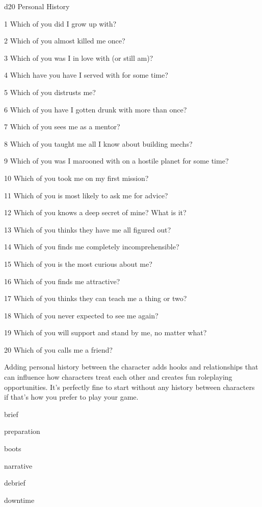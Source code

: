  d20       Personal	History

 1         Which of you did I grow up with?

 2         Which of you almost killed me once?

 3         Which of you was I in love with (or still am)?

 4         Which have you have I served with for some time?

 5         Which of you distrusts me?

 6         Which of you have I gotten drunk with more than once?

 7         Which of you sees me as a mentor?

 8         Which of you taught me all I know about building mechs?

 9         Which of you was I marooned with on a hostile planet for some time?

10       Which of you took me on my first mission?

  11       Which of you is most likely to ask me for advice?

  12       Which of you knows a deep secret of mine? What is it?

  13       Which of you thinks they have me all figured out?

  14       Which of you finds me completely incomprehensible?

  15       Which of you is the most curious about me?

  16       Which of you finds me attractive?

  17       Which of you thinks they can teach me a thing or two?

  18       Which of you never expected to see me again?

  19       Which of you will support and stand by me, no matter what?

  20       Which of you calls me a friend?

Adding personal history between the character adds hooks and relationships that can influence
how characters treat each other and creates fun roleplaying opportunities. It's perfectly fine to
start without any history between characters if that's how you prefer to play your game.

{brief}

{preparation}

{boots}

{narrative}

{debrief}

{downtime}
